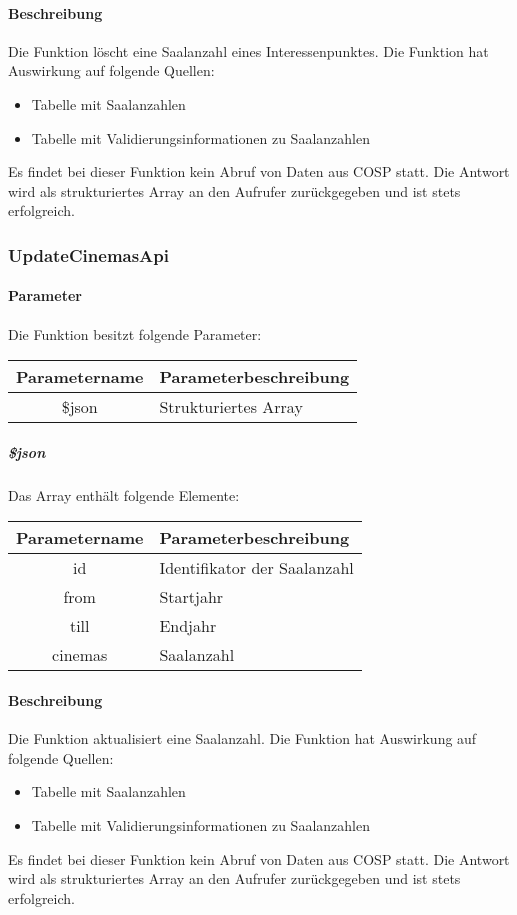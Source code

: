 \paragraph{Beschreibung} Die Funktion löscht eine Saalanzahl eines Interessenpunktes. Die Funktion hat Auswirkung auf folgende Quellen:
\begin{itemize}
	\item Tabelle mit Saalanzahlen
	\item Tabelle mit Validierungsinformationen zu Saalanzahlen
\end{itemize}
Es findet bei dieser Funktion kein Abruf von Daten aus {\glqq COSP\grqq} statt. Die Antwort wird als strukturiertes Array an den Aufrufer zurückgegeben und ist stets erfolgreich.
\subsubsection{UpdateCinemasApi}
\paragraph{Parameter} Die Funktion besitzt folgende Parameter:
\begin{table}[H]
	\begin{tabular}{|c|p{11cm}|}
		\hline
		\textbf{Parametername} & \textbf{Parameterbeschreibung} \\ \hline
		\$json & Strukturiertes Array \\ \hline
	\end{tabular}
\end{table}
\subparagraph{\$json}Das Array enthält folgende Elemente:
\begin{table}[H]
	\begin{tabular}{|c|p{11cm}|}
		\hline
		\textbf{Parametername} & \textbf{Parameterbeschreibung} \\ \hline
		id       & Identifikator der Saalanzahl \\ \hline
		from     & Startjahr \\ \hline
		till     & Endjahr \\ \hline
		cinemas  & Saalanzahl \\ \hline
	\end{tabular}
\end{table}
\paragraph{Beschreibung} Die Funktion aktualisiert eine Saalanzahl. Die Funktion hat Auswirkung auf folgende Quellen:
\begin{itemize}
	\item Tabelle mit Saalanzahlen
	\item Tabelle mit Validierungsinformationen zu Saalanzahlen
\end{itemize}
Es findet bei dieser Funktion kein Abruf von Daten aus {\glqq COSP\grqq} statt. Die Antwort wird als strukturiertes Array an den Aufrufer zurückgegeben und ist stets erfolgreich.

